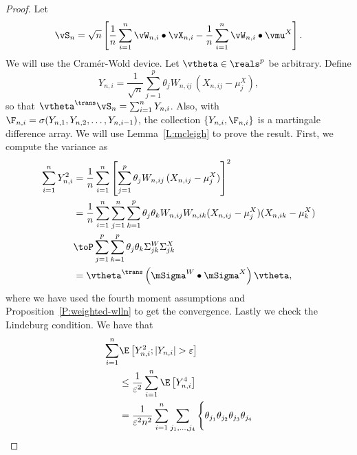 \begin{proof}
    Let
    \[
        \vS_n
        =
        \sqrt{n} \left[ \frac{1}{n} \sum_{i=1}^n \vW_{n,i} \bullet \vX_{n,i}
            - \frac{1}{n} \sum_{i=1}^n \vW_{n,i} \bullet \vmu^X\right].
    \]
    We will use the Cram\'er-Wold device.  Let $\vtheta \in \reals^p$ be
    arbitrary.  Define
    \[
        Y_{n,i} 
        = 
        \frac{1}{\sqrt{n}}
        \sum_{j=1}^p
            \theta_j W_{n,ij} \, (X_{n,ij} - \mu^X_j),
    \]
    so that $\vtheta^\trans \vS_n = \sum_{i=1}^n Y_{n,i}$.  Also, with
    $\F_{n,i} = \sigma( Y_{n,1}, Y_{n,2}, \ldots, Y_{n,i-1})$, the collection
    $\{ Y_{n,i}, \F_{n,i} \}$ is a martingale difference array.  We will
    use Lemma~\ref{L:mcleigh} to prove the result.  First, we compute
    the variance as
    \begin{align*}
        \sum_{i=1}^n Y_{n,i}^2
        &=  \frac{1}{n}
            \sum_{i=1}^n
            \left[
                \sum_{j=1}^p
                    \theta_j W_{n,ij} \, (X_{n,ij} - \mu^X_j) 
            \right]^2 \\
        &=  \frac{1}{n}
            \sum_{i=1}^n
            \sum_{j=1}^n
            \sum_{k=1}^p
                \theta_j \theta_k
                W_{n,ij} W_{n,ik}
                (X_{n,ij} - \mu^X_j) (X_{n,ik} - \mu^X_k) \\
        &\toP \sum_{j=1}^p \sum_{k=1}^p
              \theta_j \theta_k
              \Sigma^W_{jk} \Sigma^X_{jk} \\
        &= \vtheta^\trans 
           \left(
               \mSigma^W
               \bullet
               \mSigma^X
           \right)
           \vtheta,
    \end{align*}
    where we have used  the fourth moment assumptions and
    Proposition~\ref{P:weighted-wlln} to get the convergence.  Lastly we check 
    the Lindeburg condition.  We have that
    \begin{align*}
        \sum_{i=1}^n
            &\E \left[ 
                Y_{n,i}^2 ; | Y_{n,i} | > \varepsilon
            \right] \\
        &\leq
            \frac{1}{\varepsilon^2}
            \sum_{i=1}^n
            \E \left[ 
                Y_{n,i}^4
            \right] \\
        &=
            \frac{1}{\varepsilon^2 n^2}
            \sum_{i=1}^n
            \sum_{j_1, \ldots, j_4}
                \Bigg\{
                 \theta_{j_1}
                 \theta_{j_2}
                 \theta_{j_3}
                 \theta_{j_4} 

\end{align*}
\end{proof}
